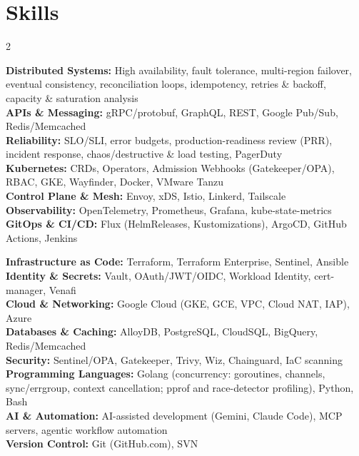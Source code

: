 \documentclass[11pt]{article}       %
\begin{document}
\section*{Skills}
\begin{multicols}{2}
\begin{flushleft}
\parbox{\linewidth}{\raggedright
  \textbf{Distributed Systems:} High availability, fault tolerance, multi-region failover, eventual consistency, reconciliation loops, idempotency, retries \& backoff, capacity \& saturation analysis\\
  \textbf{APIs \& Messaging:} gRPC/protobuf, GraphQL, REST, Google Pub/Sub, Redis/Memcached\\
  \textbf{Reliability:} SLO/SLI, error budgets, production-readiness review (PRR), incident response, chaos/destructive \& load testing, PagerDuty\\
  \textbf{Kubernetes:} CRDs, Operators, Admission Webhooks (Gatekeeper/OPA), RBAC, GKE, Wayfinder, Docker, VMware Tanzu\\
  \textbf{Control Plane \& Mesh:} Envoy, xDS, Istio, Linkerd, Tailscale\\
  \textbf{Observability:} OpenTelemetry, Prometheus, Grafana, kube-state-metrics\\
  \textbf{GitOps \& CI/CD:} Flux (HelmReleases, Kustomizations), ArgoCD, GitHub Actions, Jenkins\\
}
\end{flushleft}
\begin{flushright}
\parbox{\linewidth}{\raggedleft
  \textbf{Infrastructure as Code:} Terraform, Terraform Enterprise, Sentinel, Ansible\\
  \textbf{Identity \& Secrets:} Vault, OAuth/JWT/OIDC, Workload Identity, cert-manager, Venafi\\
  \textbf{Cloud \& Networking:} Google Cloud (GKE, GCE, VPC, Cloud NAT, IAP), Azure\\
  \textbf{Databases \& Caching:} AlloyDB, PostgreSQL, CloudSQL, BigQuery, Redis/Memcached\\
  \textbf{Security:} Sentinel/OPA, Gatekeeper, Trivy, Wiz, Chainguard, IaC scanning\\
  \textbf{Programming Languages:} Golang (concurrency: goroutines, channels, sync/errgroup, context cancellation; pprof and race-detector profiling), Python, Bash\\
  \textbf{AI \& Automation:} AI-assisted development (Gemini, Claude Code), MCP servers, agentic workflow automation\\
  \textbf{Version Control:} Git (GitHub.com), SVN\\
}
\end{flushright}
\end{multicols}
\end{document}
